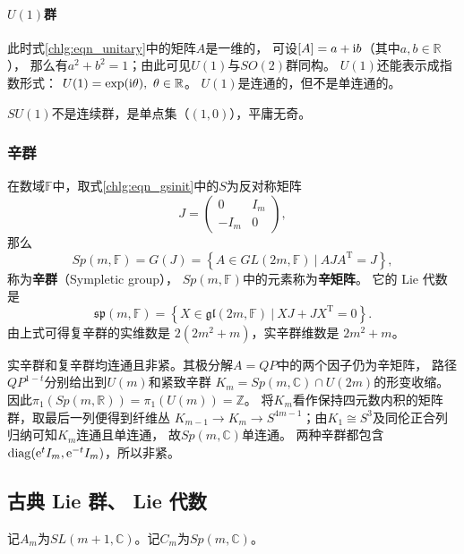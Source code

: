 \paragraph{$U(1)$群}
此时式\eqref{chlg:eqn_unitary}中的矩阵$A$是一维的，
可设$[A]=a+\mathrm{i} b$（其中$a,b\in \mathbb{R}$），
那么有$a^2+b^2=1$；由此可见$U(1)$与$SO(2)$群同构。
$U(1)$还能表示成指数形式：
$U(1)=\exp (\mathrm{i} \theta),\ \theta\in \mathbb{R}$。
$U(1)$是连通的，但不是单连通的。

$SU(1)$不是连续群，是单点集（$(1,0)$），平庸无奇。

\subsubsection{辛群}
在数域$\mathbb{F}$中，取式\eqref{chlg:eqn_gsinit}中的$S$为反对称矩阵
\begin{equation}
    J = \begin{pmatrix}
            0 & I_m \\ -I_m & 0
        \end{pmatrix},
\end{equation}
那么
\begin{equation}
    Sp(m,\mathbb{F})=G(J)= \left\{ A \in GL(2m,\mathbb{F})\ |\ A J {A}^{\mathrm{T}} =J \right\},
\end{equation}
称为\textbf{辛群}（Sympletic group），
$Sp(m,\mathbb{F})$中的元素称为\textbf{辛矩阵}。
它的 Lie 代数是
\begin{equation}
    \mathfrak{sp}(m,\mathbb{F})= \left\{ X \in
    \mathfrak{gl}(2m,\mathbb{F})\ |\ X J + J {X}^{\mathrm{T}} =0 \right\}.
\end{equation}
由上式可得复辛群的实维数是 $2(2m^2+m)$，实辛群维数是 $2m^2+m$。

实辛群和复辛群均连通且非紧。其极分解$A=QP$中的两个因子仍为辛矩阵，
路径$QP^{1-t}$分别给出到$U(m)$和紧致辛群
$K_m=Sp(m,\mathbb C)\cap U(2m)$的形变收缩。
因此$\pi_1(Sp(m,\mathbb R))=\pi_1(U(m))=\mathbb Z$。
将$K_m$看作保持四元数内积的矩阵群，取最后一列便得到纤维丛
$K_{m-1}\to K_m\to S^{4m-1}$；由$K_1\cong S^3$及同伦正合列归纳可知$K_m$连通且单连通，
故$Sp(m,\mathbb C)$单连通。
两种辛群都包含$\operatorname{diag}(\mathrm{e}^t I_m,\mathrm{e}^{-t}I_m)$，所以非紧。

\subsection{古典 Lie 群、 Lie 代数}

记$A_m$为$SL(m+1,\mathbb{C})$。记$C_m$为$Sp(m,\mathbb{C})$。


